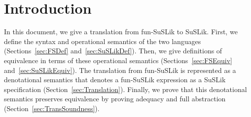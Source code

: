 \documentclass[10pt]{article}
\newcommand{\sem} [1] {\llbracket#1\rrbracket}
\newcommand{\Gsem} [1] {\mathcal{G}\sem{#1}}
\newcommand{\Ssem} [1] {\mathcal{S}\sem{#1}}
\begin{document}
\section{Introduction}

In this document, we give a translation from fun-SuSLik to SuSLik. First, we define the syntax and
operational semantics of the two languages (Sections~\ref{sec:FSDef} and~\ref{sec:SuSLikDef}).
Then, we give definitions of equivalence in terms of these
operational semantics (Sections~\ref{sec:FSEquiv} and~\ref{sec:SuSLikEquiv}). The translation from fun-SuSLik is represented as a denotational semantics
that denotes a fun-SuSLik expression as a SuSLik specification (Section~\ref{sec:Translation}). Finally, we prove that this denotational
semantics preserves equivalence by proving adequacy and full abstraction (Section~\ref{sec:TransSoundness}).


%
%
%
%
%
%
%
\end{document}
